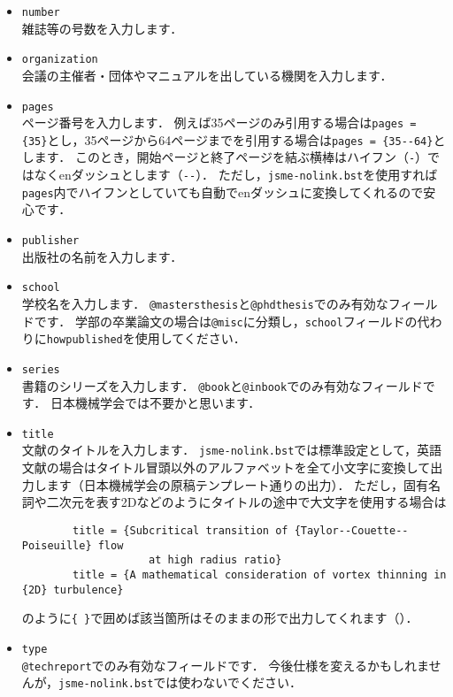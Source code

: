 \documentclass[a4paper,fleqn,uplatex,dvipdfmx]{jsarticle}
\makeatletter
\newcommand{\jsmefile}{\texttt{jsme-nolink.bst}}
\newcommand{\ttbook}{\texttt{@book}}
\newcommand{\ttinbook}{\texttt{@inbook}}
\newcommand{\ttmastersthesis}{\texttt{@mastersthesis}}
\newcommand{\ttmisc}{\texttt{@misc}}
\newcommand{\ttphdthesis}{\texttt{@phdthesis}}
\newcommand{\tttechreport}{\texttt{@techreport}}
\makeatother
\begin{document}
\begin{itemize}
    \item \verb|number| \\
        雑誌等の号数を入力します．
    \item \verb|organization| \\
        会議の主催者・団体やマニュアルを出している機関を入力します．
    \item \verb|pages| \\
        ページ番号を入力します．
        例えば35ページのみ引用する場合は\verb|pages = {35}|とし，35ページから64ページまでを引用する場合は\verb|pages = {35--64}|とします．
        このとき，開始ページと終了ページを結ぶ横棒はハイフン（\verb|-|）ではなくenダッシュとします（\verb|--|）．
        ただし，\jsmefile を使用すれば\verb|pages|内でハイフンとしていても自動でenダッシュに変換してくれるので安心です．
    \item \verb|publisher| \\
        出版社の名前を入力します．
    \item \verb|school| \\
        学校名を入力します．
        \ttmastersthesis と\ttphdthesis でのみ有効なフィールドです．
        学部の卒業論文の場合は\ttmisc に分類し，\verb|school|フィールドの代わりに\verb|howpublished|を使用してください．
    \item \verb|series| \\
        書籍のシリーズを入力します．
        \ttbook と\ttinbook でのみ有効なフィールドです．
        日本機械学会では不要かと思います．
    \item \verb|title| \\
        文献のタイトルを入力します．
        \jsmefile では標準設定として，英語文献の場合はタイトル冒頭以外のアルファベットを全て小文字に変換して出力します（日本機械学会の原稿テンプレート通りの出力）．
        ただし，固有名詞や二次元を表す2Dなどのようにタイトルの途中で大文字を使用する場合は
        \begin{verbatim}
        title = {Subcritical transition of {Taylor--Couette--Poiseuille} flow 
                    at high radius ratio}
        title = {A mathematical consideration of vortex thinning in {2D} turbulence}
        \end{verbatim}
        のように\verb|{ }|で囲めば該当箇所はそのままの形で出力してくれます（\citealp{Matsukawa:PoF2022,Yoneda:arXiv2016}）．
    \item \verb|type| \\
        \tttechreport でのみ有効なフィールドです．
        今後仕様を変えるかもしれませんが，\jsmefile では使わないでください．

\end{itemize}
\end{document}
